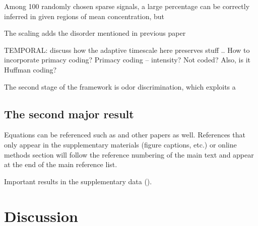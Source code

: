 Among 100 randomly chosen sparse signals, a large percentage can be correctly inferred in given regions of mean concentration, but 







The scaling adds the disorder mentioned in previous paper

TEMPORAL: discuss how the adaptive timescale here preserves stuff .. How to incorporate primacy coding?
Primacy coding -- intensity? Not coded? Also, is it Huffman coding?

The second stage of the framework is odor discrimination, which exploits a 


\subsection*{The second major result}

Equations can be referenced such as  and other papers as well\cite{Hill78a}. References
that only appear in the supplementary materials (figure captions, etc.) or online methods section
will follow the reference numbering of the main text and appear at the end of the main reference
list. \lipsum[5]

Important results in the supplementary data (). \lipsum[6]

\section*{Discussion}

\lipsum[7-9]

